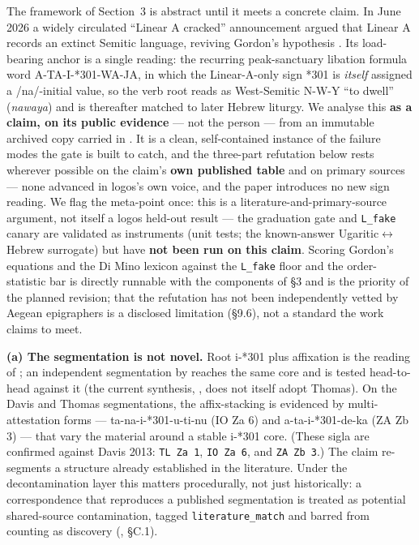 The framework of Section~3 is abstract until it meets a concrete claim. In
June 2026 a widely circulated ``Linear A cracked'' announcement
\citep{dimino2026} argued that Linear A records an extinct Semitic
language, reviving Gordon's hypothesis \citep{gordon1957, gordon1966}. Its
load-bearing anchor is a single reading: the recurring peak-sanctuary
libation formula word A-TA-I-*301-WA-JA, in which the Linear-A-only sign
*301 is \emph{itself} assigned a /na/-initial value, so the verb root
reads as West-Semitic N-W-Y ``to dwell'' (\emph{nawaya}) and is thereafter
matched to later Hebrew liturgy. We analyse this \textbf{as a claim, on its
public evidence} --- not the person --- from an immutable archived copy
carried in \artobj. It is a clean, self-contained instance of the failure
modes the gate is built to catch, and the three-part refutation below rests
wherever possible on the claim's \textbf{own published table} and on
primary sources \citep{davis2013, duhoux1992, thomas2020, salgarella2025,
steele2017} --- none advanced in logos's own voice, and the paper
introduces no new sign reading. We flag the meta-point once: this is a
literature-and-primary-source argument, not itself a logos held-out result
--- the graduation gate and \texttt{L\_fake} canary are validated as
instruments (unit tests; the known-answer Ugaritic$\leftrightarrow$Hebrew
surrogate) but have \textbf{not been run on this claim}. Scoring Gordon's
equations and the Di Mino lexicon against the \texttt{L\_fake} floor and
the order-statistic bar is directly runnable with the components of \S3 and
is the priority of the planned revision; that the refutation has not been
independently vetted by Aegean epigraphers is a disclosed limitation
(\S9.6), not a standard the work claims to meet.

\textbf{(a) The segmentation is not novel.} Root i-*301 plus affixation is
the reading of \citet{davis2013}; an independent segmentation by
\citet{thomas2020} reaches the same core and is tested head-to-head against
it (the current synthesis, \citealp{salgarella2025}, does not itself adopt
Thomas). On the Davis and Thomas segmentations, the affix-stacking is
evidenced by multi-attestation forms --- ta-na-i-*301-u-ti-nu (IO Za 6) and
a-ta-i-*301-de-ka (ZA Zb 3) --- that vary the material around a stable
i-*301 core. (These sigla are confirmed against Davis 2013: \texttt{TL Za
1}, \texttt{IO Za 6}, and \texttt{ZA Zb 3}.) The claim re-segments a
structure already established in the literature. Under the decontamination
layer this matters procedurally, not just historically: a correspondence
that reproduces a published segmentation is treated as potential
shared-source contamination,
tagged \texttt{literature\_match} and barred from counting as discovery
(\artref, \S C.1).

